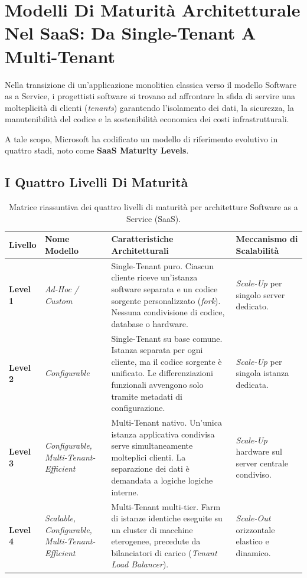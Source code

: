 \documentclass[11pt, a4paper]{article}
\begin{document}
\newpage

\section{Modelli Di Maturità Architetturale Nel SaaS: Da Single-Tenant A Multi-Tenant}

Nella transizione di un'applicazione monolitica classica verso il modello Software as a Service, i progettisti software si trovano ad affrontare la sfida di servire una molteplicità di clienti (\emph{tenants}) garantendo l'isolamento dei dati, la sicurezza, la manutenibilità del codice e la sostenibilità economica dei costi infrastrutturali.

A tale scopo, Microsoft ha codificato un modello di riferimento evolutivo in quattro stadi, noto come \textbf{SaaS Maturity Levels}.


\subsection{I Quattro Livelli Di Maturità}

\begin{table}[H]
\centering
\small
\begin{tabularx}{\textwidth}{l p{3.5cm} X p{3cm}}
\toprule
\textbf{Livello} & \textbf{Nome Modello} & \textbf{Caratteristiche Architetturali} & \textbf{Meccanismo di Scalabilità} \\
\midrule
\textbf{Level 1} & \emph{Ad-Hoc / Custom} & Single-Tenant puro. Ciascun cliente riceve un'istanza software separata e un codice sorgente personalizzato (\emph{fork}). Nessuna condivisione di codice, database o hardware. & \emph{Scale-Up} per singolo server dedicato. \\
\addlinespace
\textbf{Level 2} & \emph{Configurable} & Single-Tenant su base comune. Istanza separata per ogni cliente, ma il codice sorgente è unificato. Le differenziazioni funzionali avvengono solo tramite metadati di configurazione. & \emph{Scale-Up} per singola istanza dedicata. \\
\addlinespace
\textbf{Level 3} & \emph{Configurable, Multi-Tenant-Efficient} & Multi-Tenant nativo. Un'unica istanza applicativa condivisa serve simultaneamente molteplici clienti. La separazione dei dati è demandata a logiche logiche interne. & \emph{Scale-Up} hardware sul server centrale condiviso. \\
\addlinespace
\textbf{Level 4} & \emph{Scalable, Configurable, Multi-Tenant-Efficient} & Multi-Tenant multi-tier. Farm di istanze identiche eseguite su un cluster di macchine eterogenee, precedute da bilanciatori di carico (\emph{Tenant Load Balancer}). & \emph{Scale-Out} orizzontale elastico e dinamico. \\
\bottomrule
\end{tabularx}
\caption{Matrice riassuntiva dei quattro livelli di maturità per architetture Software as a Service (SaaS).}
\label{tab:saas_maturity}
\end{table}
\end{document}

